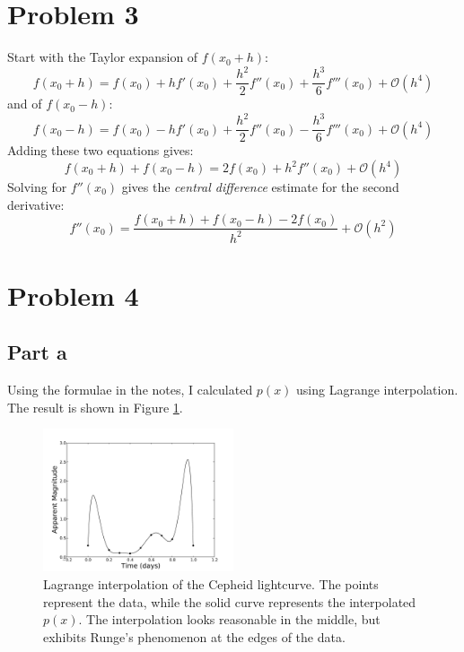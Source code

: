 \documentclass[11pt,letterpaper]{article}
\begin{document}
\section{Problem 3}
Start with the Taylor expansion of $f(x_0+h)$:
\begin{equation}
f(x_0+h)=f(x_0)+hf'(x_0)+\frac{h^2}{2}f''(x_0)+\frac{h^3}{6}f'''(x_0)+\mathcal{O}(h^4)
\end{equation}
and of $f(x_0-h)$:
\begin{equation}
f(x_0-h)=f(x_0)-hf'(x_0)+\frac{h^2}{2}f''(x_0)-\frac{h^3}{6}f'''(x_0)+\mathcal{O}(h^4)
\end{equation}
Adding these two equations gives:
\begin{equation}
f(x_0+h)+f(x_0-h)=2f(x_0)+h^2f''(x_0)+\mathcal{O}(h^4)
\end{equation}
Solving for $f''(x_0)$ gives the \emph{central difference} estimate 
for the second derivative:
\begin{equation}\boxed{
f''(x_0)=\frac{f(x_0+h)+f(x_0-h)-2f(x_0)}{h^2}+\mathcal{O}(h^2)
}\end{equation}

\section{Problem 4}
\subsection{Part a}
Using the formulae in the notes, I calculated $p(x)$ using Lagrange 
interpolation.  The result is shown in Figure \ref{fig:four}.

\begin{figure}
\centering
\includegraphics[width=0.5\textwidth]{foura.pdf}
\caption{Lagrange interpolation of the Cepheid lightcurve.  The 
points represent the data, while the solid curve represents 
the interpolated $p(x)$.  The 
interpolation looks reasonable in the middle, but exhibits Runge's 
phenomenon at the edges of the data.}
\label{fig:four}
\end{figure} 
\end{document}
